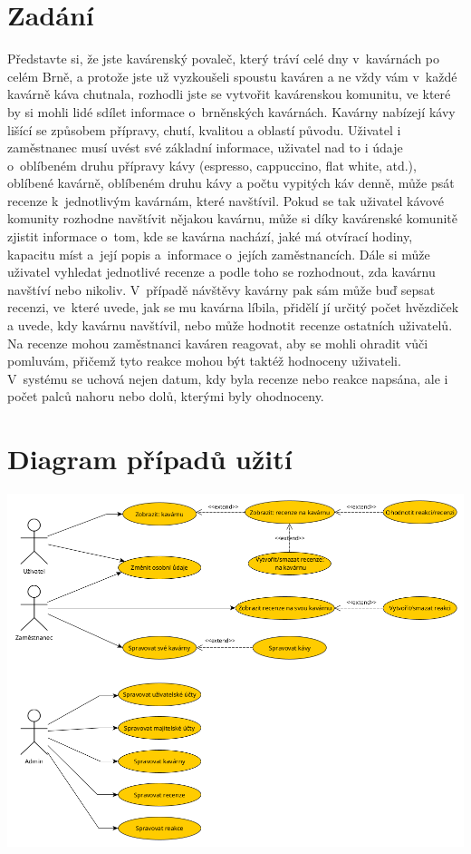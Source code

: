 \documentclass[a4paper, 11pt]{article}
\begin{document}
\section{Zadání}
Představte si, že jste kavárenský povaleč, který tráví celé dny v~kavárnách po celém Brně,
a protože jste už vyzkoušeli spoustu kaváren a ne vždy vám v~každé kavárně káva chutnala,
rozhodli jste se vytvořit kavárenskou komunitu, ve které by si mohli lidé sdílet informace
o~brněnských kavárnách. Kavárny nabízejí kávy lišící se způsobem přípravy, chutí, kvalitou a oblastí původu.
Uživatel i zaměstnanec musí uvést své základní informace, uživatel nad to i údaje o~oblíbeném druhu
přípravy kávy (espresso, cappuccino, flat white, atd.), oblíbené kavárně, oblíbeném druhu
kávy a počtu vypitých káv denně, může psát recenze k~jednotlivým kavárnám, které navštívil.
Pokud se tak uživatel kávové komunity rozhodne navštívit nějakou kavárnu, může si díky kavárenské
komunitě zjistit informace o~tom, kde se kavárna nachází, jaké má otvírací hodiny, kapacitu míst
a~její popis a~informace o~jejích zaměstnancích. Dále si může uživatel vyhledat jednotlivé recenze
a podle toho se rozhodnout, zda kavárnu navštíví nebo nikoliv. V~případě návštěvy kavárny pak sám může
buď sepsat recenzi, ve~které uvede, jak se mu kavárna líbila, přidělí jí určitý počet hvězdiček a uvede,
kdy kavárnu navštívil, nebo může hodnotit recenze ostatních uživatelů. Na recenze mohou zaměstnanci kaváren reagovat,
aby se mohli ohradit vůči pomluvám, přičemž tyto reakce mohou být taktéž hodnoceny uživateli.
V~systému se uchová nejen datum, kdy byla recenze nebo reakce napsána, ale i počet palců nahoru nebo dolů,
kterými byly ohodnoceny.

\section{Diagram případů užití}

\begin{center}
			\includegraphics[width=1\linewidth]{./IDS_UCD.png} \\
            \label{UCD}
\end{center}
\end{document}
